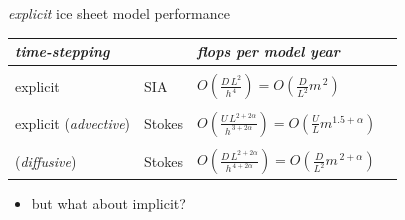 \documentclass[svgnames,
               hyperref={colorlinks,citecolor=DeepPink4,linkcolor=FireBrick,urlcolor=Maroon},
               usepdftitle=false]  %
               {beamer}
\newcommand{\oo}[1]{\displaystyle O\left(#1\right)}
\begin{document}
\begin{frame}{\emph{explicit} ice sheet model performance}

\begin{tabular}{llll}
\emph{time-stepping} &  & \emph{flops per model year} \\ \hline
\\
explicit & SIA    & $\oo{\frac{D\, L^2}{h^{\,4}}} = \oo{\frac{D}{L^2} m^{\,2}}$ \\
\\
explicit ({\footnotesize \emph{advective}}) & Stokes & $\oo{\frac{U \,L^{2+2\alpha}}{h^{\,3+2\alpha}}} = \oo{\frac{U}{L} m^{1.5+\alpha}}$ \\
\\
\phantom{explicit} ({\footnotesize \emph{diffusive}})  & Stokes & $\oo{\frac{D\, L^{2+2\alpha}}{h^{\,4+2\alpha}}} = \oo{\frac{D}{L^2} m^{\,2+\alpha}}$
\end{tabular}

\bigskip\bigskip
\begin{itemize}
\item but what about implicit?
\end{itemize}
\end{frame}
\end{document}
